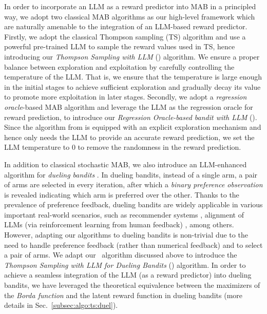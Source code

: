 In order to incorporate an LLM as a reward predictor into MAB in a principled way, we adopt two classical MAB algorithms as our high-level framework which are naturally amenable to the integration of an LLM-based reward predictor.
Firstly, we adopt the classical Thompson sampling (TS) algorithm \cite{thompson1933likelihood} and use a powerful pre-trained LLM to sample the reward values used in TS, hence introducing our \emph{Thompson Sampling with LLM} (\algts) algorithm.
We ensure a proper balance between exploration and exploitation by carefully controlling the temperature of the LLM. That is, we ensure that the temperature is large enough in the initial stages to achieve sufficient exploration and gradually decay its value to promote more exploitation in later stages.
Secondly, we adopt a \emph{regression oracle}-based MAB algorithm \cite{foster2020beyond} and leverage the LLM as the regression oracle for reward prediction, to introduce our \emph{Regression Oracle-based bandit with LLM} (\algro).
Since the algorithm from \cite{foster2020beyond} is equipped with an explicit exploration mechanism and hence only needs the LLM to provide an accurate reward prediction, we set the LLM temperature to $0$ to remove the randomness in the reward prediction.

In addition to classical stochastic MAB, we also introduce an LLM-enhanced algorithm for \emph{dueling bandits} \cite{JCSS12_yue2012k,li2024feel,verma2024neural}.
In dueling bandits, instead of a single arm, a pair of arms are selected in every iteration, after which a \emph{binary preference observation} is revealed indicating which arm is preferred over the other.
Thanks to the prevalence of preference feedback, dueling bandits are widely applicable in various important real-world scenarios,
such as recommender systems \cite{yang2024conversational}, alignment of LLMs (via reinforcement learning from human feedback) \cite{dwaracherla2024efficient}, among others.
However, adapting our algorithms to dueling bandits is non-trivial due to the need to handle preference feedback (rather than numerical feedback) and to select a pair of arms.
We adapt our \algts~algorithm discussed above to introduce the \emph{Thompson Sampling with LLM for Dueling Bandits} (\algtsduel) algorithm.
In order to achieve a seamless integration of the LLM (as a reward predictor) into dueling bandits, we have leveraged the theoretical equivalence between the maximizers of the \emph{Borda function} and the latent reward function in dueling bandits \cite{mehta2023sample} (more details in Sec.~\ref{subsec:algo:ts:duel}).

